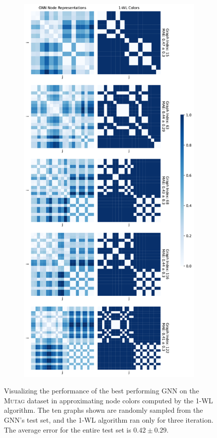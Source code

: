 \begin{figure}[!ht]
\begin{subfigure}[b]{0.45992852703\textwidth}
    \end{subfigure}
    \hfill
    \begin{subfigure}[b]{0.53007147296\textwidth}
        \includegraphics[width=\textwidth, right]{Figures/heatmaps_MUTAG_1.pdf}
    \end{subfigure}
    \hfill
    \caption{Visualizing the performance of the best performing GNN on the \textsc{Mutag} dataset in approximating node colors computed by the 1-WL algorithm. The ten graphs shown are randomly sampled from the GNN's test set, and the 1-WL algorithm ran only for three iteration. The average error for the entire test set is $0.42 \pm 0.29$.}
\end{figure}

